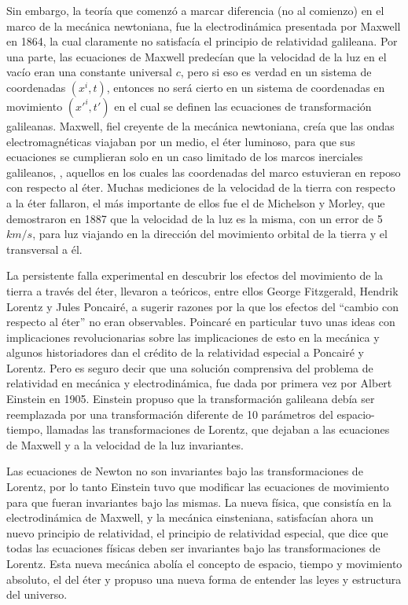 \documentclass[a4paper,10pt]{article}
\numberwithin{equation}{section}
\begin{document}
Sin embargo, la teoría que comenzó a marcar diferencia (no al comienzo) en el marco de 
la mecánica newtoniana, fue la electrodinámica presentada por Maxwell en 1864, la cual
claramente no satisfacía el principio de relatividad galileana. Por una parte, las ecuaciones 
de Maxwell predecían que la velocidad de la luz en el vacío eran una constante universal
$c$, pero si eso es verdad en un sistema de coordenadas $(x^i,t)$, entonces no será cierto
en un sistema de coordenadas en movimiento $(x'^i,t')$ en el cual se definen las ecuaciones
de transformación galileanas. Maxwell, fiel creyente de la mecánica newtoniana, creía
que las ondas electromagnéticas viajaban por un medio, el éter luminoso, para que sus 
ecuaciones se cumplieran solo en un caso limitado de los marcos inerciales galileanos, 
, aquellos en los cuales las coordenadas del marco estuvieran en reposo con respecto
al éter. Muchas mediciones de la velocidad de la tierra con respecto a la éter fallaron,
el más importante de ellos fue el de Michelson y Morley, que demostraron en 1887 que
la velocidad de la luz es la misma, con un error de 5 $km/s$, para luz viajando en la dirección
del movimiento orbital de la tierra y el transversal a él.

\vspace{.3cm}

La persistente falla experimental en descubrir los efectos del movimiento de la tierra
a través del éter, llevaron a teóricos, entre ellos George Fitzgerald, Hendrik Lorentz y 
Jules Poncairé, a sugerir razones por la que los efectos del ``cambio con respecto al éter'' 
no eran observables. Poincaré en particular tuvo unas ideas con implicaciones revolucionarias 
sobre las implicaciones de esto en la mecánica y algunos historiadores dan el crédito de 
la relatividad especial a Poncairé y Lorentz. Pero es seguro decir que una solución
comprensiva del problema de relatividad en mecánica y electrodinámica, fue dada por
primera vez por Albert Einstein en 1905. Einstein propuso que la transformación galileana debía
ser reemplazada por una transformación diferente de 10 parámetros del espacio-tiempo,
llamadas las transformaciones de Lorentz, que dejaban a las ecuaciones de Maxwell
y a la velocidad de la luz invariantes. 

\vspace{.3cm}

Las ecuaciones de Newton no son invariantes bajo las transformaciones de Lorentz, por lo
tanto Einstein tuvo que modificar las ecuaciones de movimiento para que fueran invariantes
bajo las mismas. La nueva física, que consistía en la electrodinámica de Maxwell, y la 
mecánica einsteniana, satisfacían ahora un nuevo principio de relatividad, el principio
de relatividad especial, que dice que todas las ecuaciones físicas deben ser invariantes
bajo las transformaciones de Lorentz. Esta nueva mecánica abolía el concepto de espacio,
tiempo y movimiento absoluto, el del éter y propuso una nueva forma de entender las leyes y
estructura del universo.
\end{document}

